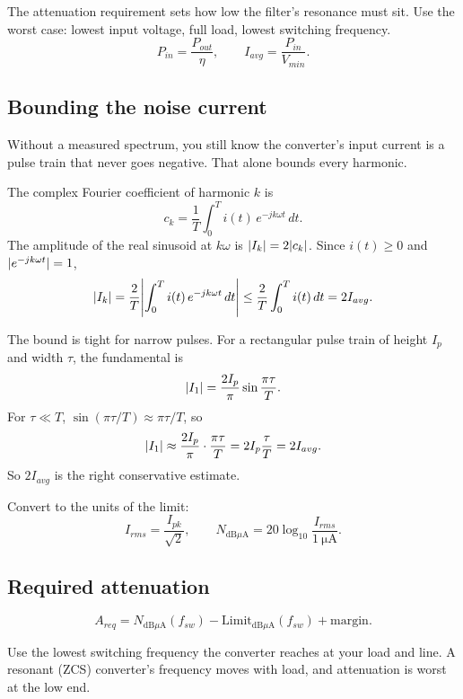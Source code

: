 The attenuation requirement sets how low the filter's resonance must sit.
Use the worst case: lowest input voltage, full load, lowest switching frequency.
\[
	P_{in} = \frac{P_{out}}{\eta}, \qquad I_{avg} = \frac{P_{in}}{V_{min}}.
\]

\subsection{Bounding the noise current}

Without a measured spectrum, you still know the converter's input current is a
pulse train that never goes negative. That alone bounds every harmonic.

\begin{derivation}
	The complex Fourier coefficient of harmonic $k$ is
	\[
		c_k = \frac{1}{T}\int_0^T i(t)\,e^{-jk\omega t}\,dt.
	\]
	The amplitude of the real sinusoid at $k\omega$ is $\lvert I_k\rvert = 2\lvert c_k\rvert$.
	Since $i(t) \geq 0$ and $\lvert e^{-jk\omega t}\rvert = 1$,
	\[
		\abs{I_k} = \frac{2}{T}\abs*{\int_0^T i(t)\,e^{-jk\omega t}\,dt}
		\leq \frac{2}{T}\int_0^T i(t)\,dt = 2I_{avg}.
	\]
\end{derivation}

\begin{derivation}
	The bound is tight for narrow pulses. For a rectangular pulse train of
	height $I_p$ and width $\tau$, the fundamental is
	\[
		\lvert I_1\rvert = \frac{2I_p}{\pi}\sin\frac{\pi\tau}{T}.
	\]
	For $\tau \ll T$, $\sin(\pi\tau/T) \approx \pi\tau/T$, so
	\[
		\lvert I_1\rvert \approx \frac{2I_p}{\pi}\cdot\frac{\pi\tau}{T} = 2I_p\frac{\tau}{T} = 2I_{avg}.
	\]
	So $2I_{avg}$ is the right conservative estimate.
\end{derivation}

Convert to the units of the limit:
\[
	I_{rms} = \frac{I_{pk}}{\sqrt{2}}, \qquad
	N_{\text{dB}\mu\text{A}} = 20\log_{10}\frac{I_{rms}}{\qty{1}{\micro\ampere}}.
\]

\subsection{Required attenuation}

\begin{equation}\label{eq:A-req}
	A_{req} = N_{\text{dB}\mu\text{A}}(f_{sw}) - \text{Limit}_{\text{dB}\mu\text{A}}(f_{sw}) + \text{margin}.
\end{equation}

Use the lowest switching frequency the converter reaches at your load and
line. A resonant (ZCS) converter's frequency moves with load, and attenuation
is worst at the low end.

